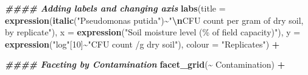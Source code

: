 \documentclass[
]{article}
\newenvironment{Shaded}{\begin{snugshade}}{\end{snugshade}}
\newcommand{\AttributeTok}[1]{\textcolor[rgb]{0.13,0.29,0.53}{#1}}
\newcommand{\DecValTok}[1]{\textcolor[rgb]{0.00,0.00,0.81}{#1}}
\newcommand{\DocumentationTok}[1]{\textcolor[rgb]{0.56,0.35,0.01}{\textbf{\textit{#1}}}}
\newcommand{\FunctionTok}[1]{\textcolor[rgb]{0.13,0.29,0.53}{\textbf{#1}}}
\newcommand{\NormalTok}[1]{#1}
\newcommand{\SpecialCharTok}[1]{\textcolor[rgb]{0.81,0.36,0.00}{\textbf{#1}}}
\newcommand{\StringTok}[1]{\textcolor[rgb]{0.31,0.60,0.02}{#1}}
\begin{document}
\begin{Shaded}
\begin{Highlighting}[]
  \DocumentationTok{\#\#\#\# Adding labels and changing axis}
  \FunctionTok{labs}\NormalTok{(}\AttributeTok{title =} \FunctionTok{expression}\NormalTok{(}\FunctionTok{italic}\NormalTok{(}\StringTok{"Pseudomonas putida"}\NormalTok{)}\SpecialCharTok{\textasciitilde{}}\StringTok{"}\SpecialCharTok{\textbackslash{}n}\StringTok{CFU count per gram of dry soil, by replicate"}\NormalTok{),}
       \AttributeTok{x =} \FunctionTok{expression}\NormalTok{(}\StringTok{"Soil moisture level (\% of field capacity)"}\NormalTok{),}
       \AttributeTok{y =} \FunctionTok{expression}\NormalTok{(}\StringTok{"log"}\NormalTok{[}\DecValTok{10}\NormalTok{]}\SpecialCharTok{\textasciitilde{}}\StringTok{"CFU count /g dry soil"}\NormalTok{),}
       \AttributeTok{colour =} \StringTok{"Replicates"}\NormalTok{) }\SpecialCharTok{+}
  
  \DocumentationTok{\#\#\#\# Faceting by Contamination}
  \FunctionTok{facet\_grid}\NormalTok{(}\SpecialCharTok{\textasciitilde{}}\NormalTok{ Contamination) }\SpecialCharTok{+}
  

\end{Highlighting}
\end{Shaded}
\end{document}
